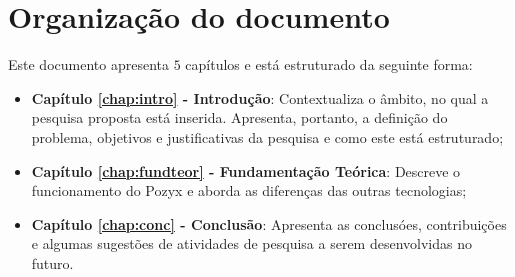 \section{Organização do documento}
\label{section:organizacao}

Este documento apresenta $5$ capítulos e está estruturado da seguinte forma:

\begin{itemize}

\item \textbf{Capítulo \ref{chap:intro} - Introdução}: Contextualiza o âmbito, no qual a pesquisa proposta está inserida. Apresenta, portanto, a definição do problema, objetivos e justificativas da pesquisa e como este \thetypeworkthree está estruturado;
\item \textbf{Capítulo \ref{chap:fundteor} - Fundamentação Teórica}: Descreve o funcionamento do Pozyx e aborda as diferenças das outras tecnologias;
\item \textbf{Capítulo \ref{chap:conc} - Conclusão}: Apresenta as conclusóes, contribuições e algumas sugestões de atividades de pesquisa a serem desenvolvidas no futuro.

\end{itemize}
